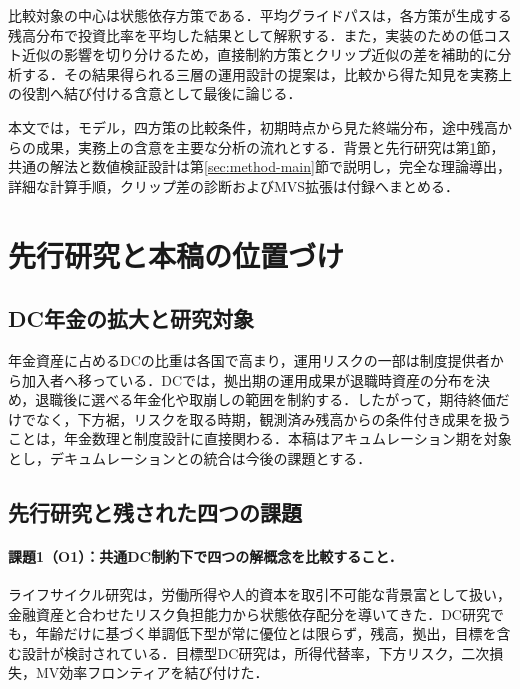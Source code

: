 \documentclass[10pt,a4paper]{article}
\theoremstyle{plain}
\theoremstyle{definition}
\begin{document}
比較対象の中心は状態依存方策である．平均グライドパスは，各方策が生成する残高分布で投資比率を平均した結果として解釈する．また，実装のための低コスト近似の影響を切り分けるため，直接制約方策とクリップ近似の差を補助的に分析する．その結果得られる三層の運用設計の提案は，比較から得た知見を実務上の役割へ結び付ける含意として最後に論じる．

本文では，モデル，四方策の比較条件，初期時点から見た終端分布，途中残高からの成果，実務上の含意を主要な分析の流れとする．背景と先行研究は第\ref{sec:literature}節，共通の解法と数値検証設計は第\ref{sec:method-main}節で説明し，完全な理論導出，詳細な計算手順，クリップ差の診断およびMVS拡張は付録へまとめる．
\section{先行研究と本稿の位置づけ}
\label{sec:literature}

\subsection{DC年金の拡大と研究対象}
年金資産に占めるDCの比重は各国で高まり，運用リスクの一部は制度提供者から加入者へ移っている\citep{OECD2025PensionMarkets,TAI2026GPAS}．DCでは，拠出期の運用成果が退職時資産の分布を決め，退職後に選べる年金化や取崩しの範囲を制約する．したがって，期待終価だけでなく，下方裾，リスクを取る時期，観測済み残高からの条件付き成果を扱うことは，年金数理と制度設計に直接関わる．本稿はアキュムレーション期を対象とし，デキュムレーションとの統合は今後の課題とする．

\subsection{先行研究と残された四つの課題}
\paragraph{課題1（O1）：共通DC制約下で四つの解概念を比較すること．}
ライフサイクル研究は，労働所得や人的資本を取引不可能な背景富として扱い，金融資産と合わせたリスク負担能力から状態依存配分を導いてきた\citep{Merton1969,BodieMertonSamuelson1992,Viceira2001,CoccoGomesMaenhout2005}．DC研究でも，年齢だけに基づく単調低下型が常に優位とは限らず，残高，拠出，目標を含む設計が検討されている\citep{CairnsBlakeDowd2006,BasuByrneDrew2011,ForsythVetzal2019,Estrada2019}．目標型DC研究は，所得代替率，下方リスク，二次損失，MV効率フロンティアを結び付けた\citep{VignaHaberman2001,HabermanVigna2002,HojgaardVigna2007,Vigna2014,MenoncinVigna2017}．
\end{document}

